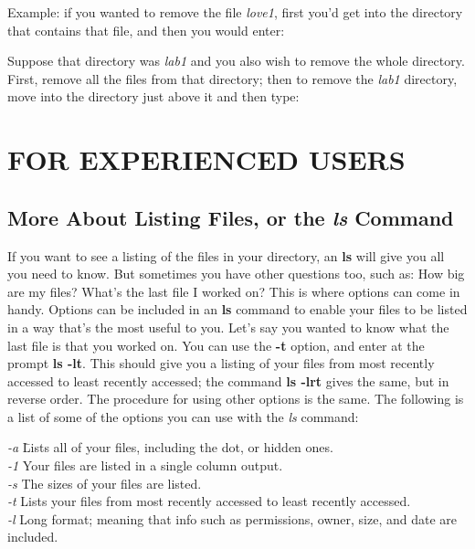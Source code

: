 	Example: if you wanted to remove the file {\it love1}, first
you'd get into the directory that contains that file, and then you would
enter:


\noindent Suppose that directory was {\it lab1} and you also wish to
remove the whole directory.  First, remove all the files from that
directory; then to remove the {\it lab1} directory, move into the
directory just above it and then type:


\section{FOR EXPERIENCED USERS}

\subsection{More About Listing Files, or the {\it ls} Command}

	If you want to see a listing of the files in your directory, an
{\bf ls} will give you all you need to know.  But sometimes you have
other questions too, such as: How big are my files? What's the last file
I worked on? This is where options can come in handy.  Options can be
included in an {\bf ls} command to enable your files to be listed in a
way that's the most useful to you.  Let's say you wanted to know what
the last file is that you worked on.  You can use the {\bf -t} option, and
enter at the prompt {\bf ls -lt}.  This should give you a listing of
your files from most recently accessed to least recently accessed; the
command {\bf ls -lrt} gives the same, but in reverse order.  The
procedure for using other options is the same.  The following is a list of
some of the options you can use with the {\it ls} command:

\begin{tabbing}
\textit{-a} \hspace{0.5in} \= Lists all of your files, including the dot, or hidden ones. \\
\textit{-1} \> Your files are listed in a single column output. \\
\textit{-s} \> The sizes of your files are listed. \\
\textit{-t} \> Lists your files from most recently accessed to least recently accessed. \\
\textit{-l} \> Long format; meaning that info such as permissions, owner, size, and date are included. \\
\end{tabbing}

